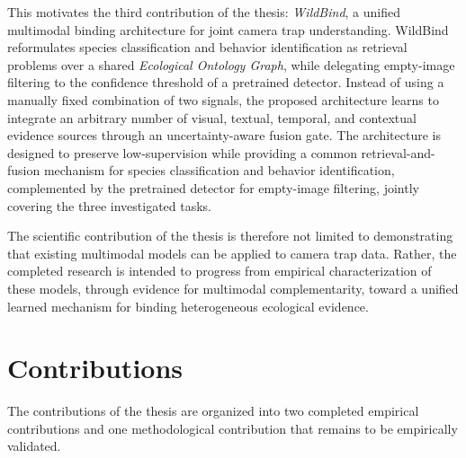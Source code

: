 This motivates the third contribution of the thesis: \textit{WildBind}, a unified multimodal binding architecture for joint camera trap understanding. WildBind reformulates species classification and behavior identification as retrieval problems over a shared \textit{Ecological Ontology Graph}, while delegating empty-image filtering to the confidence threshold of a pretrained detector. Instead of using a manually fixed combination of two signals, the proposed architecture learns to integrate an arbitrary number of visual, textual, temporal, and contextual evidence sources through an uncertainty-aware fusion gate. The architecture is designed to preserve low-supervision while providing a common retrieval-and-fusion mechanism for species classification and behavior identification, complemented by the pretrained detector for empty-image filtering, jointly covering the three investigated tasks.

The scientific contribution of the thesis is therefore not limited to demonstrating that existing multimodal models can be applied to camera trap data. Rather, the completed research is intended to progress from empirical characterization of these models, through evidence for multimodal complementarity, toward a unified learned mechanism for binding heterogeneous ecological evidence.

\section{Contributions}\label{sec:contrib}

The contributions of the thesis are organized into two completed empirical contributions and one methodological contribution that remains to be empirically validated.

